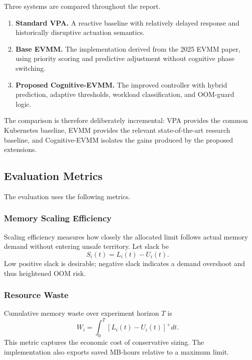 \documentclass[12pt,a4paper]{article}
\begin{document}
Three systems are compared throughout the report.
\begin{enumerate}[label=\arabic*)]
    \item \textbf{Standard VPA.} A reactive baseline with relatively delayed response and historically disruptive actuation semantics.
    \item \textbf{Base EVMM.} The implementation derived from the 2025 EVMM paper, using priority scoring and predictive adjustment without cognitive phase switching.
    \item \textbf{Proposed Cognitive-EVMM.} The improved controller with hybrid prediction, adaptive thresholds, workload classification, and OOM-guard logic.
\end{enumerate}

The comparison is therefore deliberately incremental: VPA provides the common Kubernetes baseline, EVMM provides the relevant state-of-the-art research baseline, and Cognitive-EVMM isolates the gains produced by the proposed extensions.

\subsection{Evaluation Metrics}

The evaluation uses the following metrics.

\subsubsection{Memory Scaling Efficiency}

Scaling efficiency measures how closely the allocated limit follows actual memory demand without entering unsafe territory. Let slack be
\begin{equation}
\label{eq:slack}
S_i(t)=L_i(t)-U_i(t).
\end{equation}
Low positive slack is desirable; negative slack indicates a demand overshoot and thus heightened OOM risk.

\subsubsection{Resource Waste}

Cumulative memory waste over experiment horizon $T$ is
\begin{equation}
\label{eq:waste}
W_i = \int_0^T [L_i(t)-U_i(t)]^{+}dt.
\end{equation}
This metric captures the economic cost of conservative sizing. The implementation also exports saved MB-hours relative to a maximum limit.
\end{document}
